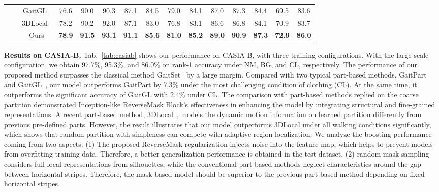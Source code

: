 \documentclass[runningheads]{llncs}
\begin{document}
\begin{table}[ht]
{\begin{tabular}{c|c|c|c|c|c|c|c|c|c|c|c|c|c|c}
\cline{3-15}          &       & \multicolumn{1}{c|}{GaitGL~\cite{gaitgl}} & 76.6  & 90.0  & 90.3  & 87.1  & 84.5  & 79.0  & 84.1  & 87.0  & 87.3  & 84.4  & 69.5  & 83.6   \\
\cline{3-15}          &       & \multicolumn{1}{c|}{3DLocal~\cite{3dlocal}} & 78.2  & 90.2  & 92.0  & 87.1  & 83.0  & 76.8  & 83.1  & 86.6  & 86.8  & 84.1  & 70.9  & 83.7   \\
\cline{3-15}          &       & Ours  & \textbf{78.9} & \textbf{91.5} & \textbf{93.1} & \textbf{91.1} & \textbf{85.6} & \textbf{81.0} & \textbf{85.2} & \textbf{89.0} & \textbf{90.9} & \textbf{87.3} & \textbf{72.9} & \textbf{86.0}  \\

    \bottomrule
    \end{tabular}%
 }
\label{comparision_casia}
\vspace*{-1em}
\end{table}%


\textbf{Results on CASIA-B.} Tab.~\ref{tab:casiab} shows our performance on CASIA-B, with three training configurations. With the large-scale configuration, we obtain 97.7\%, 95.3\%, and 86.0\% on rank-1 accuracy under NM, BG, and CL, respectively. The performance of our proposed method surpasses the classical method GaitSet~\cite{aaai2019gaitset} by a large margin. Compared with two typical part-based methods, GaitPart~\cite{gaitpart} and GaitGL~\cite{gaitgl}, our model outperforms GaitPart by 7.3\% under the most challenging condition of clothing (CL). At the same time, it outperforms the significant accuracy of GaitGL with 2.4\% under CL. The comparison with part-based methods replied on the coarse partition demonstrated Inception-like ReverseMask Block's effectiveness in enhancing the model by integrating structural and fine-grained representations. A recent part-based method, 3DLocal~\cite{3dlocal}, models the dynamic motion information on learned partition differently from previous pre-defined parts. However, the result illustrates that our model outperforms 3DLocal under all walking conditions significantly, which shows that random partition with simpleness can compete with adaptive region localization. We analyze the boosting performance coming from two aspects: (1) The proposed ReverseMask regularization injects noise into the feature map, which helps to prevent models from overfitting training data. Therefore, a better generalization performance is obtained in the test dataset. (2) random mask sampling considers full local representations from silhouettes, while the conventional part-based methods neglect characteristics around the gap between horizontal stripes. Therefore, the mask-based model should be superior to the previous part-based method depending on fixed horizontal stripes. 
\end{document}
